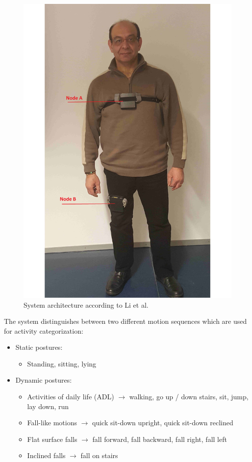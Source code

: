 \documentclass[review]{elsarticle}
\begin{document}
\begin{figure}[!ht] 
	\centering
	\includegraphics[scale=0.36]{Images/Stankovic-papa2.pdf}
	\caption[System architecture according to Li et al.]{System architecture according to Li et al. \cite{Li2009}}
	\label{fig:LietAl-Architecture}
\end{figure}
The system distinguishes between two different motion sequences which are used for activity categorization: 
\begin{itemize}
	\item Static postures:
	\begin{itemize}
		\item Standing, sitting, lying
	\end{itemize}
	\item Dynamic postures:
	\begin{itemize}
		\item Activities of daily life (ADL) $\rightarrow$ walking, go up / down stairs, sit, jump, lay down, run
		\item Fall-like motions $\rightarrow$ quick sit-down upright, quick sit-down reclined
		\item Flat surface falls $\rightarrow$ fall forward, fall backward, fall right, fall left
		\item Inclined falls $\rightarrow$ fall on stairs
	\end{itemize}
\end{itemize}
\end{document}
